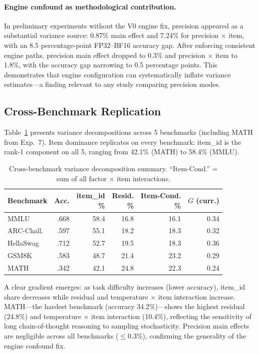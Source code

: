 \documentclass[letterpaper,11pt]{article}
\begin{document}
\paragraph{Engine confound as methodological contribution.}
In preliminary experiments without the V0 engine fix, precision appeared as a substantial variance source: 0.87\% main effect and 7.24\% for precision $\times$ item, with an 8.5 percentage-point FP32--BF16 accuracy gap.
After enforcing consistent engine paths, precision main effect dropped to 0.3\% and precision $\times$ item to 1.8\%, with the accuracy gap narrowing to 0.5 percentage points.
This demonstrates that engine configuration can systematically inflate variance estimates---a finding relevant to any study comparing precision modes.

\subsection{Cross-Benchmark Replication}

Table~\ref{tab:cross_benchmark} presents variance decompositions across 5 benchmarks (including MATH from Exp.~7).
Item dominance replicates on every benchmark: item\_id is the rank-1 component on all 5, ranging from 42.1\% (MATH) to 58.4\% (MMLU).

\begin{table}[t]
\centering
\caption{Cross-benchmark variance decomposition summary. ``Item-Cond.'' = sum of all factor $\times$ item interactions.}
\label{tab:cross_benchmark}
\small
\begin{tabular}{lrrrrr}
\toprule
Benchmark & Acc. & \makecell{item\_id \\ \%} & \makecell{Resid. \\ \%} & \makecell{Item-Cond. \\ \%} & \makecell{$G$ \\ (curr.)} \\
\midrule
MMLU & .668 & 58.4 & 16.8 & 16.1 & 0.34 \\
ARC-Chall. & .597 & 55.1 & 18.2 & 18.3 & 0.32 \\
HellaSwag & .712 & 52.7 & 19.5 & 18.3 & 0.36 \\
GSM8K & .583 & 48.7 & 21.4 & 23.2 & 0.29 \\
MATH & .342 & 42.1 & 24.8 & 22.3 & 0.24 \\
\bottomrule
\end{tabular}
\end{table}

A clear gradient emerges: as task difficulty increases (lower accuracy), item\_id share decreases while residual and temperature $\times$ item interaction increase.
MATH---the hardest benchmark (accuracy 34.2\%)---shows the highest residual (24.8\%) and temperature $\times$ item interaction (10.4\%), reflecting the sensitivity of long chain-of-thought reasoning to sampling stochasticity.
Precision main effects are negligible across all benchmarks ($\leq$0.3\%), confirming the generality of the engine confound fix.
\end{document}
